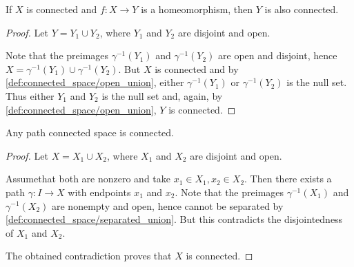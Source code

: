 \begin{proposition}\label{thm:homomorphism_preserves_connectedness}
  If \( X \) is connected and \( f: X \to Y \) is a homeomorphism, then \( Y \) is also connected.
\end{proposition}
\begin{proof}
  Let \( Y = Y_1 \cup Y_2 \), where \( Y_1 \) and \( Y_2 \) are disjoint and open.

  Note that the preimages \( \gamma^{-1}(Y_1) \) and \( \gamma^{-1}(Y_2) \) are open and disjoint, hence \( X = \gamma^{-1}(Y_1) \cup \gamma^{-1}(Y_2) \). But \( X \) is connected and by \cref{def:connected_space/open_union}, either \( \gamma^{-1}(Y_1) \) or \( \gamma^{-1}(Y_2) \) is the null set. Thus either \( Y_1 \) and \( Y_2 \) is the null set and, again, by \cref{def:connected_space/open_union}, \( Y \) is connected.
\end{proof}

\begin{proposition}\label{thm:path_connected_implies_connected}
  Any path connected space is connected.
\end{proposition}
\begin{proof}
  Let \( X = X_1 \cup X_2 \), where \( X_1 \) and \( X_2 \) are disjoint and open.

  Assume\LEM that both are nonzero and take \( x_1 \in X_1, x_2 \in X_2 \). Then there exists a path \( \gamma: I \to X \) with endpoints \( x_1 \) and \( x_2 \). Note that the preimages \( \gamma^{-1}(X_1) \) and \( \gamma^{-1}(X_2) \) are nonempty and open, hence cannot be separated by \cref{def:connected_space/separated_union}. But this contradicts the disjointedness of \( X_1 \) and \( X_2 \).

  The obtained contradiction proves that \( X \) is connected.
\end{proof}
